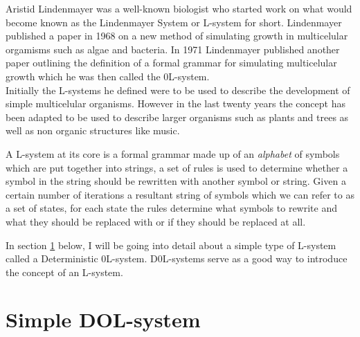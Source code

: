 \begin{flushleft}

Aristid Lindenmayer was a well-known biologist who started work on what would become known as the Lindenmayer System or L-system for short. Lindenmayer published a paper in 1968 on a new method of simulating growth in multicelular orgamisms such as algae and bacteria\cite{lindenmayer1968mathematical}. In 1971 Lindenmayer published another paper outlining the definition of a formal grammar for simulating multicelular growth which he was then called the 0L-system. \cite {lindenmayer1971developmental}\\
Initially the L-systems he defined were to be used to describe the development of simple multicelular organisms. However in the last twenty years the concept has been adapted to be used to describe larger organisms such as plants and trees as well as non organic structures like music. \cite{worth2005growing} \\

\vspace{5mm}

A L-system at its core is a formal grammar made up of an \textit{alphabet} of symbols which are put together into strings, a set of rules is used to determine whether a symbol in the string should be rewritten with another symbol or string. Given a certain number of iterations a resultant string of symbols which we can refer to as a set of states, for each state the rules determine what symbols to rewrite and what they should be replaced with or if they should be replaced at all.\\

\vspace{5mm}


In section \ref{Simple DOL-systems} below, I will be going into detail about a simple type of L-system called a Deterministic 0L-system.  D0L-systems serve as a good way to introduce the concept of an L-system.

\end{flushleft}

\section{Simple DOL-system} \label{Simple DOL-systems}

